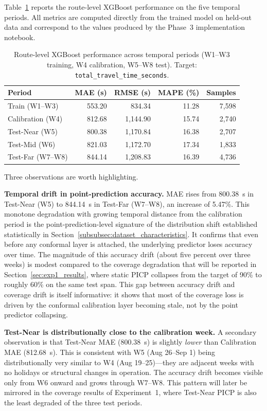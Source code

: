 Table~\ref{tab:route_level_performance} reports the route-level XGBoost performance on the five temporal periods. All metrics are computed directly from the trained model on held-out data and correspond to the values produced by the Phase~3 implementation notebook.

\begin{table}[htbp]
\centering
\caption{Route-level XGBoost performance across temporal periods (W1--W3 training, W4 calibration, W5--W8 test). Target: \texttt{total\_travel\_time\_seconds}.}
\label{tab:route_level_performance}
\begin{tabular}{lrrrr}
\toprule
\textbf{Period} & \textbf{MAE (s)} & \textbf{RMSE (s)} & \textbf{MAPE (\%)} & \textbf{Samples} \\
\midrule
Train (W1--W3) & 553.20 & 834.34 & 11.28 & 7,598 \\
Calibration (W4) & 812.68 & 1,144.90 & 15.74 & 2,740 \\
Test-Near (W5) & 800.38 & 1,170.84 & 16.38 & 2,707 \\
Test-Mid (W6) & 821.03 & 1,172.70 & 17.34 & 1,833 \\
Test-Far (W7--W8) & 844.14 & 1,208.83 & 16.39 & 4,736 \\
\bottomrule
\end{tabular}
\end{table}

Three observations are worth highlighting.

\textbf{Temporal drift in point-prediction accuracy.} MAE rises from 800.38~s in Test-Near (W5) to 844.14~s in Test-Far (W7--W8), an increase of 5.47\%. This monotone degradation with growing temporal distance from the calibration period is the point-prediction-level signature of the distribution shift established statistically in Section~\ref{subsubsec:dataset_characteristics}. It confirms that even before any conformal layer is attached, the underlying predictor loses accuracy over time. The magnitude of this accuracy drift (about five percent over three weeks) is modest compared to the coverage degradation that will be reported in Section~\ref{sec:exp1_results}, where static PICP collapses from the target of 90\% to roughly 60\% on the same test span. This gap between accuracy drift and coverage drift is itself informative: it shows that most of the coverage loss is driven by the conformal calibration layer becoming stale, not by the point predictor collapsing.

\textbf{Test-Near is distributionally close to the calibration week.} A secondary observation is that Test-Near MAE (800.38~s) is slightly \emph{lower} than Calibration MAE (812.68~s). This is consistent with W5 (Aug 26--Sep 1) being distributionally very similar to W4 (Aug 19--25)---they are adjacent weeks with no holidays or structural changes in operation. The accuracy drift becomes visible only from W6 onward and grows through W7--W8. This pattern will later be mirrored in the coverage results of Experiment~1, where Test-Near PICP is also the least degraded of the three test periods.

